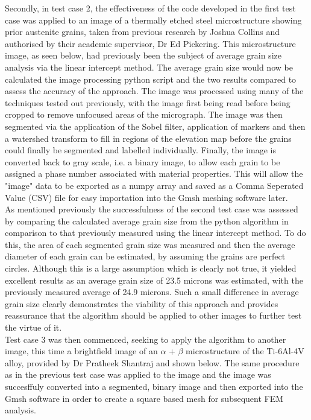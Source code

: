 \documentclass[\report.tex]{subfiles}
\begin{document}
\noindent Secondly, in test case 2, the effectiveness of the code developed in the first test case was applied to an image of a thermally etched steel microstructure showing prior austenite grains, taken from previous research by Joshua Collins and authorised by their academic supervisor, Dr Ed Pickering. This microstructure image, as seen below, had previously been the subject of average grain size analysis via the linear intercept method. The average grain size would now be calculated the image processing python script and the two results compared to assess the accuracy of the approach. The image was processed using many of the techniques tested out previously, with the image first being read before being cropped to remove unfocused areas of the micrograph. The image was then segmented via the application of the Sobel filter, application of markers and then a watershed transform to fill in regions of the elevation map before the grains could finally be segmented and labelled individually. Finally, the image is converted back to gray scale, i.e. a binary image, to allow each grain to be assigned a phase number associated with material properties. This will allow the "image" data to be exported as a numpy array and saved as a Comma Seperated Value (CSV) file for easy importation into the Gmsh meshing software later.\\

\noindent As mentioned previously the successfulness of the second test case was assessed by comparing the calculated average grain size from the python algorithm in comparison to that previously measured using the linear intercept method. To do this, the area of each segmented grain size was measured and then the average diameter of each grain can be estimated, by assuming the grains are perfect circles. Although this is a large assumption which is clearly not true, it yielded excellent results as an average grain size of 23.5 microns was estimated, with the previously measured average of 24.9 microns. Such a small difference in average grain size clearly demonstrates the viability of this approach and provides reassurance that the algorithm should be applied to other images to further test the virtue of it.\\


\noindent Test case 3 was then commenced, seeking to apply the algorithm to another image, this time a brightfield image of an $\alpha$ + $\beta$ microstructure of the Ti-6Al-4V alloy, provided by Dr Pratheek Shantraj and shown below. The same procedure as in the previous test case was applied to the image and the image was succesffuly converted into a segmented, binary image and then exported into the Gmsh software in order to create a square based mesh for subsequent FEM analysis.
\end{document}
